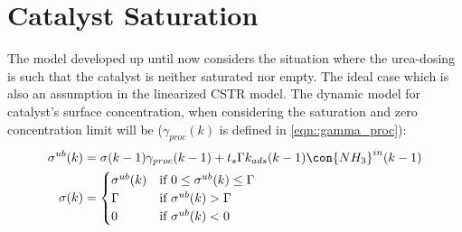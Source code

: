 \newpage
\section{Catalyst Saturation}

The model developed up until now considers the situation where the urea-dosing is such that the catalyst is neither
saturated nor empty. The ideal case which is also an assumption in the linearized CSTR model. The dynamic model for
catalyst's surface concentration, when considering the saturation and zero concentration limit will be
($\gamma_{proc}(k)$ is defined in \ref{eqn::gamma_proc}):
\begin{align}
        \sigma^{ub}(k) &= \sigma (k-1) \gamma_{proc}(k-1) + t_s \Gamma k_{ads}(k-1) \con{NH_3}^{in}(k-1)
        \label{eqn::unbounded_sigma_mdl}\\
        \sigma(k) &= \begin{cases}
                                \sigma^{ub}(k) & \text{if }  0 \leq \sigma^{ub}(k) \leq \Gamma\\
                                \Gamma         & \text{if }  \sigma^{ub}(k) > \Gamma \\
                                0              & \text{if }  \sigma^{ub}(k) < 0
                        \end{cases}
        \label{eqn::actual_sigma_mdl}
\end{align}

